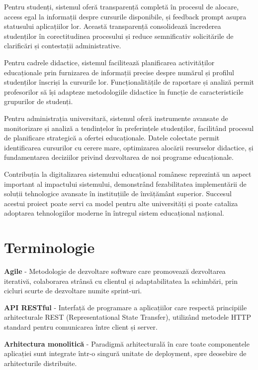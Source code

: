 \documentclass[12pt,a4paper]{report}
\begin{document}
Pentru studenți, sistemul oferă transparență completă în procesul de alocare, access egal la informații despre cursurile disponibile, și feedback prompt asupra statusului aplicațiilor lor. Această transparență consolidează încrederea studenților în corectitudinea procesului și reduce semnificativ solicitările de clarificări și contestații administrative.

Pentru cadrele didactice, sistemul facilitează planificarea activităților educaționale prin furnizarea de informații precise despre numărul și profilul studenților înscriși la cursurile lor. Funcționalitățile de raportare și analiză permit profesorilor să își adapteze metodologiile didactice în funcție de caracteristicile grupurilor de studenți.

Pentru administrația universitară, sistemul oferă instrumente avansate de monitorizare și analiză a tendințelor în preferințele studenților, facilitând procesul de planificare strategică a ofertei educaționale. Datele colectate permit identificarea cursurilor cu cerere mare, optimizarea alocării resurselor didactice, și fundamentarea deciziilor privind dezvoltarea de noi programe educaționale.

Contribuția la digitalizarea sistemului educațional românesc reprezintă un aspect important al impactului sistemului, demonstrând fezabilitatea implementării de soluții tehnologice avansate în instituțiile de învățământ superior. Succesul acestui proiect poate servi ca model pentru alte universități și poate cataliza adoptarea tehnologiilor moderne în întregul sistem educațional național.

\chapter{Terminologie}

\textbf{Agile} - Metodologie de dezvoltare software care promovează dezvoltarea iterativă, colaborarea strânsă cu clientul și adaptabilitatea la schimbări, prin cicluri scurte de dezvoltare numite sprint-uri.

\textbf{API RESTful} - Interfață de programare a aplicațiilor care respectă principiile arhitecturale REST (Representational State Transfer), utilizând metodele HTTP standard pentru comunicarea între client și server.

\textbf{Arhitectura monolitică} - Paradigmă arhitecturală în care toate componentele aplicației sunt integrate într-o singură unitate de deployment, spre deosebire de arhitecturile distribuite.
\end{document}
